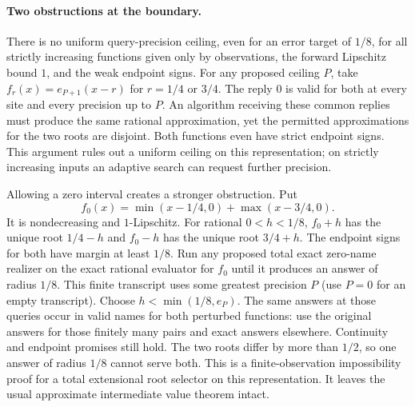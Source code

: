 \paragraph{Two obstructions at the boundary.}
There is no uniform query-precision ceiling, even for an error target of
$1/8$, for all strictly increasing functions given only by observations,
the forward Lipschitz bound $1$, and the weak endpoint signs. For any
proposed ceiling $P$, take $f_r(x)=e_{P+1}(x-r)$ for
$r=1/4$ or $3/4$. The reply $0$ is valid for both at every site and every
precision up to $P$. An algorithm receiving these common replies must
produce the same rational approximation, yet the permitted approximations
for the two roots are disjoint. Both functions even have strict endpoint signs.
This argument rules out a uniform ceiling on this representation; on strictly
increasing inputs an adaptive search can request further precision.

Allowing a zero interval creates a stronger obstruction. Put
\[
 f_0(x)=\min(x-1/4,0)+\max(x-3/4,0).
\]
It is nondecreasing and $1$-Lipschitz. For rational $0<h<1/8$,
$f_0+h$ has the unique root $1/4-h$ and $f_0-h$ has the unique root
$3/4+h$. The endpoint signs for both have margin at least $1/8$.
Run any proposed total exact zero-name realizer on the exact rational
evaluator for $f_0$ until it produces an answer of radius $1/8$.
This finite transcript uses some greatest precision $P$ (use $P=0$ for
an empty transcript). Choose $h<\min(1/8,e_P)$.
The same answers at those queries occur in valid names for both perturbed
functions: use the original answers for those finitely many pairs and
exact answers elsewhere. Continuity and endpoint promises still hold.
The two roots differ by more than $1/2$, so one answer of radius $1/8$
cannot serve both. This is a finite-observation impossibility proof for a
total extensional root selector on this representation. It leaves the
usual approximate intermediate value theorem intact.
